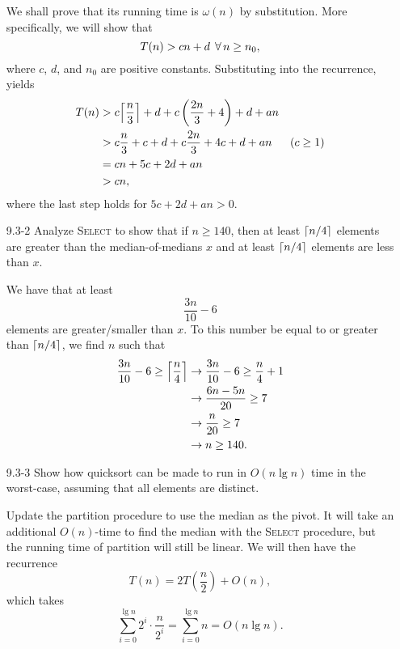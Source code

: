 \begin{enumerate}
\begin{framed}
We shall prove that its running time is $\omega(n)$ by substitution. More
specifically, we will show that
\[
  T(n) > cn + d \; \operatorname{\forall} n \ge n_0,
\]
where $c$, $d$, and $n_0$ are positive constants. Substituting into the
recurrence, yields
\begin{equation*}
\begin{aligned}
  T(n) &> c \Bigl\lceil \frac{n}{3} \Bigr\rceil + d + c \left( \frac{2n}{3} + 4 \right) + d + an\\
       &> c \frac{n}{3} + c + d + c \frac{2n}{3} + 4c + d + an & \text{($c \ge 1$)}\\
       &= cn + 5c + 2d + an\\
       &> cn,\\
\end{aligned}
\end{equation*}
where the last step holds for $5c + 2d + an > 0$.
\end{framed}

\item[9.3-2]{Analyze \textsc{Select} to show that if $n \ge 140$, then at least
$\lceil n/4\rceil$ elements are greater than the median-of-medians $x$ and at least
$\lceil n/4\rceil$ elements are less than $x$.}

\begin{framed}
We have that at least
\[
  \frac{3n}{10} - 6
\]
elements are greater/smaller than $x$. To this number be equal to or greater
than $\lceil n/4\rceil$, we find $n$ such that
\begin{equation*}
\begin{aligned}
  \frac{3n}{10} - 6 \ge \Bigl\lceil \frac{n}{4} \Bigr\rceil
  &\rightarrow \frac{3n}{10} - 6 \ge \frac{n}{4} + 1\\
  &\rightarrow \frac{6n - 5n}{20} \ge 7\\
  &\rightarrow \frac{n}{20} \ge 7\\
  &\rightarrow n \ge 140.
\end{aligned}
\end{equation*}
\end{framed}

\item[9.3-3]{Show how quicksort can be made to run in $O(n \lg n)$ time in the
worst-case, assuming that all elements are distinct.}

\begin{framed}
Update the partition procedure to use the median as the pivot. It will take an
additional $O(n)$-time to find the median with the \textsc{Select} procedure,
but the running time of partition will still be linear. We will then have the
recurrence
\[
  T(n) = 2T \left( \frac{n}{2} \right) + O(n),
\]
which takes
\[
  \sum_{i = 0}^{\lg n} 2^i \cdot \frac{n}{2^i} = \sum_{i = 0}^{\lg n} n = O(n \lg n).
\]
\end{framed}


\end{enumerate}
